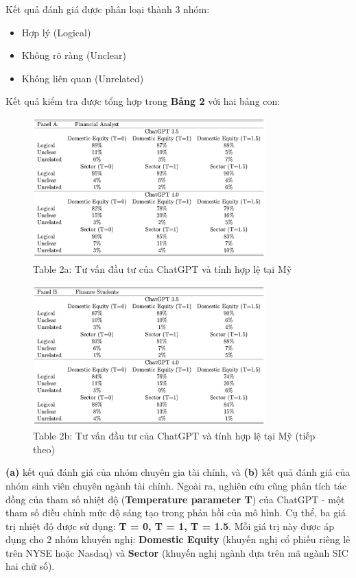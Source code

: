 \documentclass[a4paper,12pt]{article}
\begin{document}
Kết quả đánh giá được phân loại thành 3 nhóm:

\begin{itemize}
    \item Hợp lý (Logical)
    \item Không rõ ràng (Unclear)
    \item Không liên quan (Unrelated)
\end{itemize}
Kết quả kiểm tra được tổng hợp trong \textbf{Bảng 2} với hai bảng con: 
\begin{figure}[H]
    \centering
    \includegraphics[width=0.8\textwidth]{table/tab2a.png}
    \caption*{Table 2a: Tư vấn đầu tư của ChatGPT và tính hợp lệ tại Mỹ}
    \label{fig:fig2}
\end{figure}
\begin{figure}[H]
    \centering
    \includegraphics[width=0.8\textwidth]{table/tab2b.png}
    \caption*{Table 2b: Tư vấn đầu tư của ChatGPT và tính hợp lệ tại Mỹ (tiếp theo)}
    \label{fig:fig2}
\end{figure}
\textbf{(a)} kết quả đánh giá của nhóm chuyên gia tài chính, và \textbf{(b)} kết quả đánh giá của nhóm sinh viên chuyên ngành tài chính. Ngoài ra, nghiên cứu cũng phân tích tác đồng của tham số nhiệt độ (\textbf{Temperature parameter T}) của ChatGPT - một tham số điều chỉnh mức độ sáng tạo trong phản hồi của mô hình. Cụ thể, ba giá trị nhiệt độ được sử dụng: \textbf{T = 0, T = 1, T = 1.5}. Mỗi giá trị này được áp dụng cho 2 nhóm khuyến nghị: \textbf{Domestic Equity} (khuyến nghị cổ phiếu riêng lẻ trên NYSE hoặc Nasdaq) và \textbf{Sector} (khuyến nghị ngành dựa trên mã ngành SIC hai chữ số).
\end{document}
